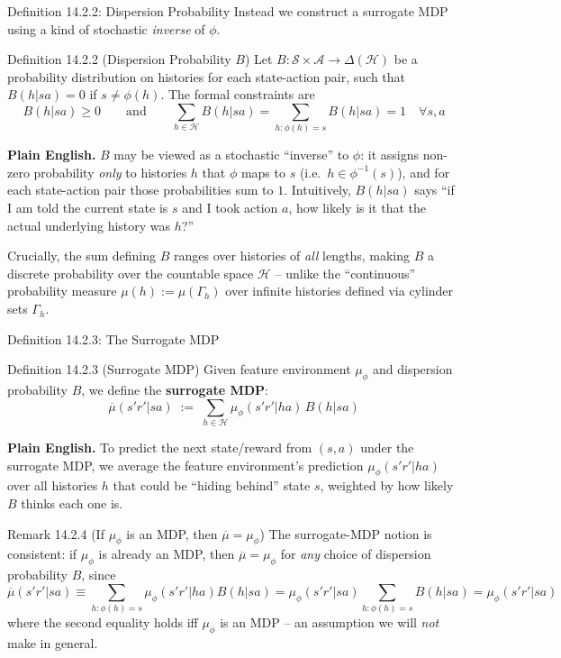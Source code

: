 \documentclass[aspectratio=169,10pt]{beamer}
\newcommand{\Hc}{\mathcal{H}}
\newcommand{\Sc}{\mathcal{S}}
\newcommand{\Ac}{\mathcal{A}}
\begin{document}
\begin{frame}{Definition 14.2.2: Dispersion Probability}
  Instead we construct a surrogate MDP using a kind of stochastic
  \emph{inverse} of $\phi$.
  \begin{block}{Definition 14.2.2 (Dispersion Probability $B$)}
    Let $B:\Sc\times\Ac\to\Delta(\Hc)$ be a probability distribution on
    histories for each state-action pair, such that $B(h|sa)=0$ if
    $s\neq\phi(h)$. The formal constraints are
    \[
      B(h|sa)\ge 0 \qquad\text{and}\qquad \sum_{h\in\Hc} B(h|sa) = \sum_{h:\phi(h)=s} B(h|sa) = 1 \quad \forall s,a
    \]
  \end{block}
  \textbf{Plain English.} $B$ may be viewed as a stochastic ``inverse'' to
  $\phi$: it assigns non-zero probability \emph{only} to histories $h$ that
  $\phi$ maps to $s$ (i.e.\ $h\in\phi^{-1}(s)$), and for each state-action
  pair those probabilities sum to $1$. Intuitively, $B(h|sa)$ says ``if I
  am told the current state is $s$ and I took action $a$, how likely is it
  that the actual underlying history was $h$?''

  \vspace{0.4em}
  Crucially, the sum defining $B$ ranges over histories of \emph{all}
  lengths, making $B$ a discrete probability over the countable space
  $\Hc$ -- unlike the ``continuous'' probability measure $\mu(h):=\mu(\Gamma_h)$
  over infinite histories defined via cylinder sets $\Gamma_h$.
\end{frame}

\begin{frame}{Definition 14.2.3: The Surrogate MDP}
  \begin{block}{Definition 14.2.3 (Surrogate MDP)}
    Given feature environment $\mu_\phi$ and dispersion probability $B$, we
    define the \textbf{surrogate MDP}:
    \[
      \overline{\mu}(s'r'|sa) \;:=\; \sum_{h\in\Hc} \mu_\phi(s'r'|ha)\,B(h|sa)
    \]
  \end{block}
  \textbf{Plain English.} To predict the next state/reward from $(s,a)$
  under the surrogate MDP, we average the feature environment's prediction
  $\mu_\phi(s'r'|ha)$ over all histories $h$ that could be ``hiding
  behind'' state $s$, weighted by how likely $B$ thinks each one is.

  \begin{block}{Remark 14.2.4 (If $\mu_\phi$ is an MDP, then $\overline\mu=\mu_\phi$)}
    The surrogate-MDP notion is consistent: if $\mu_\phi$ is already an
    MDP, then $\overline\mu=\mu_\phi$ for \emph{any} choice of dispersion
    probability $B$, since
    \[
      \overline{\mu}(s'r'|sa) \equiv \sum_{h:\phi(h)=s}\mu_\phi(s'r'|ha)B(h|sa)
      = \mu_\phi(s'r'|sa)\sum_{h:\phi(h)=s}B(h|sa) = \mu_\phi(s'r'|sa)
    \]
    where the second equality holds iff $\mu_\phi$ is an MDP -- an
    assumption we will \emph{not} make in general.
  \end{block}
\end{frame}
\end{document}
